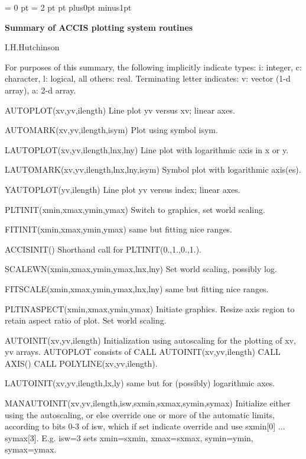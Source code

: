 \newif \iftth
\iftth 
\else
\parindent= 0 pt
\parskip = 2 pt
 pt
\rightskip 0pt plus0pt minus1pt
\fi

\magnification {}

\centerline{\bf Summary of ACCIS plotting system routines}

\centerline{I.H.Hutchinson}
\bigskip


For purposes of this summary, the following implicitly indicate types:
i: integer, c: character, l: logical, all others: real.
Terminating letter indicates: v: vector (1-d array), a: 2-d array.


\iftth \special{html:<a href="plottest.f"><img align="right" src="plainplot.png"></a>}\fi
AUTOPLOT(xv,yv,ilength) Line plot yv versus xv; linear axes.

AUTOMARK(xv,yv,ilength,isym) Plot using symbol isym.

LAUTOPLOT(xv,yv,ilength,lnx,lny) Line plot with logarithmic axis in x or y.

LAUTOMARK(xv,yv,ilength,lnx,lny,isym) Symbol plot with logarithmic axis(es).
 
YAUTOPLOT(yv,ilength) Line plot yv versus index; linear axes.



PLTINIT(xmin,xmax,ymin,ymax) Switch to graphics, set world scaling.

FITINIT(xmin,xmax,ymin,ymax) same but fitting nice ranges.

ACCISINIT() Shorthand call for PLTINIT(0.,1.,0.,1.).

SCALEWN(xmin,xmax,ymin,ymax,lnx,lny) Set world scaling, possibly log.

FITSCALE(xmin,xmax,ymin,ymax,lnx,lny) same but fitting nice ranges.

PLTINASPECT(xmin,xmax,ymin,ymax) Initiate graphics. Resize axis region
to retain aspect ratio of plot. Set world scaling.

AUTOINIT(xv,yv,ilength) Initialization using autoscaling for the
plotting of xv, yv arrays. AUTOPLOT consists of CALL
AUTOINIT(xv,yv,ilength) CALL AXIS() CALL POLYLINE(xv,yv,ilength).

LAUTOINIT(xv,yv,ilength,lx,ly) same but for (possibly) logarithmic axes.

MANAUTOINIT(xv,yv,ilength,isw,sxmin,sxmax,symin,symax) Initialize
either using the autoscaling, or else override one or more of the
automatic limits, according to bits 0-3 of isw, which if set indicate
override and use sxmin[0] ...  symax[3]. E.g. isw=3 sets xmin=sxmin,
xmax=sxmax, symin=ymin, symax=ymax.

